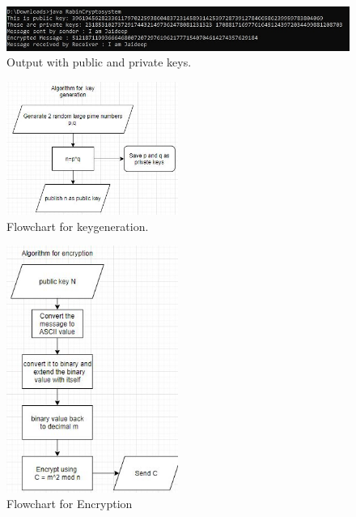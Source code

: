 \documentclass[12pt,a4paper]{article}
\begin{document}
\begin{figure}[htbp]
  \centering
  \includegraphics[width=1.1\textwidth]{Output.jpg}
  \caption{Output with public and private keys.}
  \label{fig:Output}
\end{figure}

\begin{figure}[htbp]
  \centering
  \includegraphics[width=0.5\textwidth]{keygeneration.JPG}
  \caption{Flowchart for keygeneration.}
  \label{fig:keygeneration}
\end{figure}

\begin{figure}[htbp]
  \centering
  \includegraphics[width=0.5\textwidth]{Encrypt.JPG}
  \caption{Flowchart for Encryption}
  \label{fig:Encrypt}
\end{figure}
\end{document}

